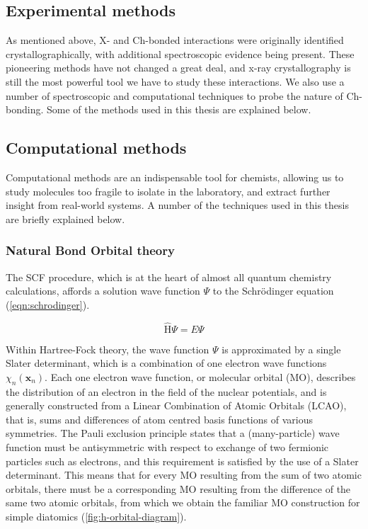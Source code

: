 \begin{refsection}

\chapter{Experimental methods}\label{ch:methods}
As mentioned above, X- and Ch-bonded interactions were originally identified crystallographically, with additional spectroscopic evidence being present.
These pioneering methods have not changed a great deal, and x-ray crystallography is still the most powerful tool we have to study these interactions.
We also use a number of spectroscopic and computational techniques to probe the nature of Ch-bonding.
Some of the methods used in this thesis are explained below.

\section{Computational methods}
Computational methods are an indispensable tool for chemists, allowing us to study molecules too fragile to isolate in the laboratory, and extract further insight from real-world systems.
A number of the techniques used in this thesis are briefly explained below.

\subsection{Natural Bond Orbital theory}
The SCF procedure, which is at the heart of almost all quantum chemistry calculations, affords a solution wave function $ \Psi $ to the Schr\"{o}dinger equation (\cref{eqn:schrodinger}).

\begin{equation}
    \hat{\mathrm{H}}\Psi = E\Psi
    \label{eqn:schrodinger}
\end{equation}

Within Hartree-Fock theory, the wave function $ \Psi $ is approximated by a single Slater determinant, which is a combination of one electron wave functions $\chi_{n}(\mathbf{x}_{n})$.
Each one electron wave function, or molecular orbital (MO), describes the distribution of an electron in the field of the nuclear potentials, and is generally constructed from a Linear Combination of Atomic Orbitals (LCAO), that is, sums and differences of atom centred basis functions of various symmetries.
The Pauli exclusion principle states that a (many-particle) wave function must be antisymmetric with respect to exchange of two fermionic particles such as electrons, and this requirement is satisfied by the use of a Slater determinant.
This means that for every MO resulting from the sum of two atomic orbitals, there must be a corresponding MO resulting from the difference of the same two atomic orbitals, from which we obtain the familiar MO construction for simple diatomics (\cref{fig:h-orbital-diagram}).


\end{refsection}
